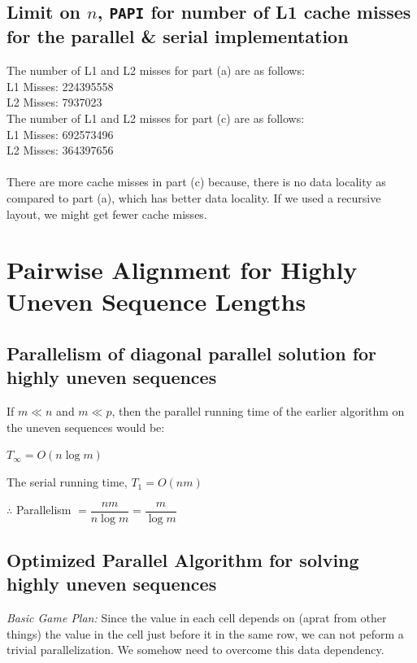 \documentclass{article}
\begin{document}
\subsection{Limit on $n$, \texttt{PAPI} for number of L1 cache misses for the parallel \& serial implementation}
The number of L1 and L2 misses for part (a) are as follows:\\
L1 Misses: 224395558\\
L2 Misses: 7937023\\

The number of L1 and L2 misses for part (c) are as follows:\\
L1 Misses: 692573496\\
L2 Misses: 364397656\\
\\
There are more cache misses in part (c) because, there is no data locality
as compared to part (a), which has better data locality. If we used a
recursive layout, we might get fewer cache misses.

\clearpage

\section{Pairwise Alignment for Highly Uneven Sequence Lengths}

\subsection{Parallelism of diagonal parallel solution for highly uneven sequences}

If $m \ll n$ and $m \ll p$, then the parallel running time of the earlier algorithm on the uneven sequences would be:

$T_{\infty} = O(n\log{m})$

The serial running time, $T_1 = O(nm)$

$\therefore$ Parallelism $= \dfrac{nm}{n\log{m}} = \dfrac{m}{\log{m}}$

\subsection{Optimized Parallel Algorithm for solving highly uneven sequences}

\textit{Basic Game Plan:} Since the value in each cell depends on
(aprat from other things) the value in the cell just before it in the
same row, we can not peform a trivial parallelization. We somehow need
to overcome this data dependency.
\end{document}
